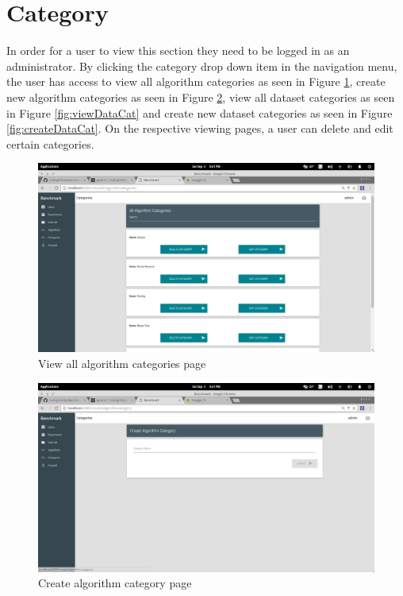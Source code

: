 \documentclass[11pt,a4paper]{article}
\begin{document}
\section{Category}
In order for a user to view this section they need to be logged in as an administrator.
By clicking the category drop down item in the navigation menu, the user has access to
view all algorithm categories as seen in Figure \ref{fig:viewAlCat}, create new algorithm
categories as seen in Figure \ref{fig:createAlCat}, view all dataset categories as seen in
Figure \ref{fig:viewDataCat} and create new dataset categories as seen in Figure \ref{fig:createDataCat}.
On the respective viewing pages, a user can delete and edit certain categories.

\begin{figure}[H]
	\begin{center}
		\includegraphics[scale=0.3]{../Images/User Manual/View Algorithm Categories.png}
		\caption{View all algorithm categories page}
		\label{fig:viewAlCat}
	\end{center}  
\end{figure}
\begin{figure}[H]
	\begin{center}
		\includegraphics[scale=0.3]{../Images/User Manual/Create Algorithm Category.png}
		\caption{Create algorithm category page}
		\label{fig:createAlCat}
	\end{center}  
\end{figure}
\end{document}

